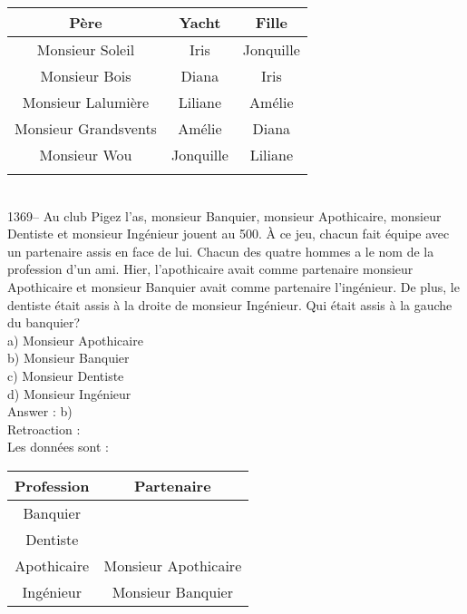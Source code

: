 ﻿\documentclass[letterpaper, 12pt]{article}
\begin{document}
\begin{tabular}{|c|c|c|} \hline
{\bf P\`ere} & {\bf Yacht} & {\bf Fille}  \\ \hline \hline

Monsieur Soleil        & Iris      &  Jonquille \\ \hline Monsieur
Bois          & Diana     &  Iris      \\ \hline Monsieur
Lalumi\`ere & Liliane   &  Am\'elie  \\ \hline Monsieur Grandsvents
& Am\'elie
&  Diana     \\ \hline Monsieur Wou & Jonquille &  Liliane   \\
\hline
\multicolumn{3}{c}{}\\
\end{tabular}\\


1369-- Au club \og Pigez l'as\fg , monsieur Banquier, monsieur
Apothicaire, monsieur Dentiste et monsieur Ing\'enieur jouent \og au
500\fg.  \`A ce jeu, chacun fait \'equipe avec un partenaire assis
en face de lui.  Chacun des quatre hommes a le nom de la profession
d'un ami.  Hier, l'apothicaire avait comme partenaire monsieur
Apothicaire et monsieur Banquier avait comme partenaire
l'ing\'enieur.  De plus, le dentiste \'etait assis \`a la droite
de monsieur Ing\'enieur.  Qui \'etait assis \`a la gauche du banquier?\\
a) Monsieur Apothicaire\\
b) Monsieur Banquier\\
c) Monsieur Dentiste\\
d) Monsieur Ing\'enieur\\

Answer : b)\\

Retroaction : \\
Les donn\'ees sont : \\
\begin{tabular}{|c|c|} \hline
{\bf Profession} & {\bf Partenaire}    \\ \hline \hline

Banquier      &                       \\ \hline Dentiste      &
\\ \hline Apothicaire   & Monsieur Apothicaire  \\ \hline
Ing\'enieur   & Monsieur Banquier     \\ \hline
\end{tabular}\\
\end{document}
